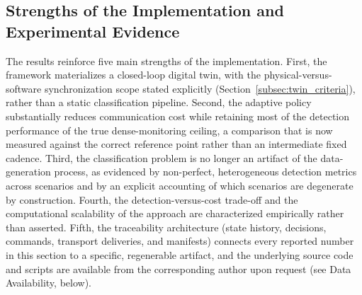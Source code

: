 \documentclass{ieeeaccess}
\begin{document}
\subsection{Strengths of the Implementation and Experimental Evidence}
The results reinforce five main strengths of the implementation. First, the framework materializes a closed-loop digital twin, with the physical-versus-software synchronization scope stated explicitly (Section~\ref{subsec:twin_criteria}), rather than a static classification pipeline. Second, the adaptive policy substantially reduces communication cost while retaining most of the detection performance of the true dense-monitoring ceiling, a comparison that is now measured against the correct reference point rather than an intermediate fixed cadence. Third, the classification problem is no longer an artifact of the data-generation process, as evidenced by non-perfect, heterogeneous detection metrics across scenarios and by an explicit accounting of which scenarios are degenerate by construction. Fourth, the detection-versus-cost trade-off and the computational scalability of the approach are characterized empirically rather than asserted. Fifth, the traceability architecture (state history, decisions, commands, transport deliveries, and manifests) connects every reported number in this section to a specific, regenerable artifact, and the underlying source code and scripts are available from the corresponding author upon request (see Data Availability, below).
\end{document}

